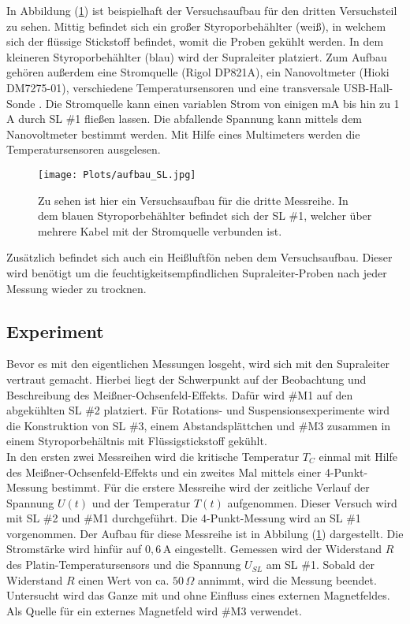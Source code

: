 In Abbildung (\ref{abb:aufbau}) ist beispielhaft der Versuchsaufbau f\"ur den dritten Versuchsteil zu sehen.
Mittig befindet sich ein gro{\ss}er Styroporbeh\"ahlter (wei{\ss}), in welchem sich der fl\"ussige Stickstoff befindet, womit die Proben gek\"uhlt werden.
In dem kleineren Styroporbeh\"ahlter (blau) wird der Supraleiter platziert.
Zum Aufbau geh\"oren au{\ss}erdem eine Stromquelle (Rigol DP821A), ein Nanovoltmeter (Hioki DM7275-01), verschiedene Temperatursensoren und eine transversale USB-Hall-Sonde .
Die Stromquelle kann einen variablen Strom von einigen mA bis hin zu 1 A durch SL \#1 flie{\ss}en lassen.
Die abfallende Spannung kann mittels dem Nanovoltmeter bestimmt werden.
Mit Hilfe eines Multimeters werden die Temperatursensoren ausgelesen.
\begin{figure}[hbtp]
	\centering
	\texttt{[image: Plots/aufbau\_SL.jpg]}
	\caption{Zu sehen ist hier ein Versuchsaufbau f\"ur die dritte Messreihe. In dem blauen Styroporbeh\"ahlter befindet sich der SL \#1, welcher \"uber mehrere Kabel mit der Stromquelle verbunden ist.}
	\label{abb:aufbau}
\end{figure}
Zus\"atzlich befindet sich auch ein Heißluftfön neben dem Versuchsaufbau.
Dieser wird ben\"otigt um die feuchtigkeitsempfindlichen Supraleiter-Proben nach jeder Messung wieder zu trocknen.

\subsection{Experiment}
Bevor es mit den eigentlichen Messungen losgeht, wird sich mit den Supraleiter vertraut gemacht.
Hierbei liegt der Schwerpunkt auf der Beobachtung und Beschreibung des Meißner-Ochsenfeld-Effekts.
Daf\"ur wird \#M1 auf den abgekühlten SL \#2 platziert.
Für Rotations- und Suspensionsexperimente wird die Konstruktion von SL \#3, einem Abstandsplättchen und \#M3 zusammen in einem Styroporbehältnis mit Fl\"ussigstickstoff gek\"uhlt. \\

In den ersten zwei Messreihen wird die kritische Temperatur $T_C$ einmal mit Hilfe des Meißner-Ochsenfeld-Effekts und ein zweites Mal mittels einer 4-Punkt-Messung bestimmt.
F\"ur die erstere Messreihe wird der zeitliche Verlauf der Spannung $U(t)$ und der Temperatur $T(t)$ aufgenommen.
Dieser Versuch wird mit SL \#2 und \#M1 durchgef\"uhrt.
Die 4-Punkt-Messung wird an SL \#1 vorgenommen.
Der Aufbau f\"ur diese Messreihe ist in Abbilung (\ref{abb:aufbau}) dargestellt.
Die Stromst\"arke wird hinf\"ur auf $0,6 \,$A eingestellt.
Gemessen wird der Widerstand $R$ des Platin-Temperatursensors und die Spannung $U_{SL}$ am SL \#1.
Sobald der Widerstand $R$ einen Wert von ca. $50 \, \Omega$ annimmt, wird die Messung beendet.
Untersucht wird das Ganze mit und ohne Einfluss eines externen Magnetfeldes.
Als Quelle f\"ur ein externes Magnetfeld wird \#M3 verwendet. \\

